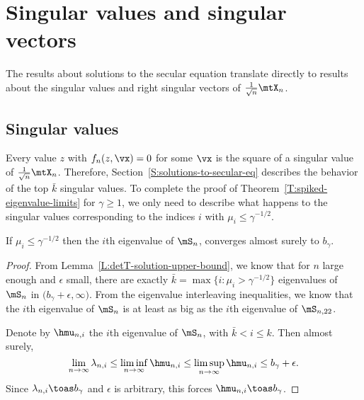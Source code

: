 \section{Singular values and singular vectors}\label{S:singular-values-and-vectors}

The results about solutions to the secular equation translate directly
to results about the singular values and right singular vectors of
$\frac{1}{\sqrt{n}} \mtX_n$.

\subsection{Singular values}

Every value $z$ with $f_n(z, \vx) = 0$ for some $\vx$ is the square of a
singular value of $\frac{1}{\sqrt{n}} \mtX_n$.  Therefore,  Section~\ref{S:solutions-to-secular-eq} describes the behavior of the top $\bar k$ singular values.  To complete the proof of Theorem~\ref{T:spiked-eigenvalue-limits} for $\gamma \geq 1$, we only need to describe what happens to the singular values corresponding to the indices $i$ with $\mu_i \leq \gamma^{-1/2}$.

\begin{lemma}\label{L:eigenvalue-below-threshold-limit}
    If $\mu_i \leq \gamma^{-1/2}$ then the $i$th eigenvalue of
    $\mS_n$, converges almost surely to $b_\gamma$.
\end{lemma}
\begin{proof}
From Lemma~\ref{L:detT-solution-upper-bound}, we know that for $n$ large
enough and $\epsilon$ small, there are exactly
$\bar k = \max \{ i : \mu_i > \gamma^{-1/2} \}$ eigenvalues of $\mS_n$
in $\big( b_\gamma + \epsilon, \infty)$.  From the eigenvalue interleaving
inequalities, we know that the $i$th eigenvalue of $\mS_n$ is at least as
big as the $i$th eigenvalue of $\mS_{n,22}$.  

Denote by $\hmu_{n,i}$ the $i$th eigenvalue of $\mS_n$, with
$\bar k < i \leq k$.  Then almost surely,
\[
    \lim_{n\to\infty} \lambda_{n,i} 
        \leq
        \liminf_{n\to\infty} \hmu_{n,i}
        \leq
        \limsup_{n\to\infty} \hmu_{n,i}        
        \leq
        b_\gamma + \epsilon.
\]
Since $\lambda_{n,i} \toas b_\gamma$ and $\epsilon$ is arbitrary, this
forces $\hmu_{n,i} \toas b_\gamma$.
\end{proof}

